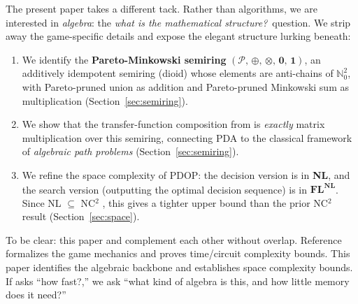\documentclass[11pt, letterpaper]{article}
\theoremstyle{definition}
\theoremstyle{remark}
\begin{document}
The present paper takes a different tack.
Rather than algorithms, we are interested in \emph{algebra}: the \emph{what is the mathematical structure?}\ question.
We strip away the game-specific details and expose the elegant structure lurking beneath:
\begin{enumerate}[leftmargin=*]
    \item We identify the \textbf{Pareto-Minkowski semiring} $(\mathcal{P},\, \oplus,\, \otimes,\, \mathbf{0},\, \mathbf{1})$, an additively idempotent semiring (dioid) whose elements are anti-chains of $\mathbb{N}_0^2$, with Pareto-pruned union as addition and Pareto-pruned Minkowski sum as multiplication (Section~\ref{sec:semiring}).
    \item We show that the transfer-function composition from \cite{Chang2026} is \emph{exactly} matrix multiplication over this semiring, connecting PDA to the classical framework of \emph{algebraic path problems} \cite{Gondran2008, Mohri2002} (Section~\ref{sec:semiring}).
    \item We refine the space complexity of PDOP: the decision version is in \textbf{NL}, and the search version (outputting the optimal decision sequence) is in $\mathbf{FL^{NL}}$. Since NL $\subseteq$ NC$^2$ \cite{Cook1985}, this gives a tighter upper bound than the prior NC$^2$ result (Section~\ref{sec:space}).
\end{enumerate}

To be clear: this paper and \cite{Chang2026} complement each other without overlap.
Reference~\cite{Chang2026} formalizes the game mechanics and proves time/circuit complexity bounds.
This paper identifies the algebraic backbone and establishes space complexity bounds.
If \cite{Chang2026} asks ``how fast?,'' we ask ``what kind of algebra is this, and how little memory does it need?''
\end{document}
